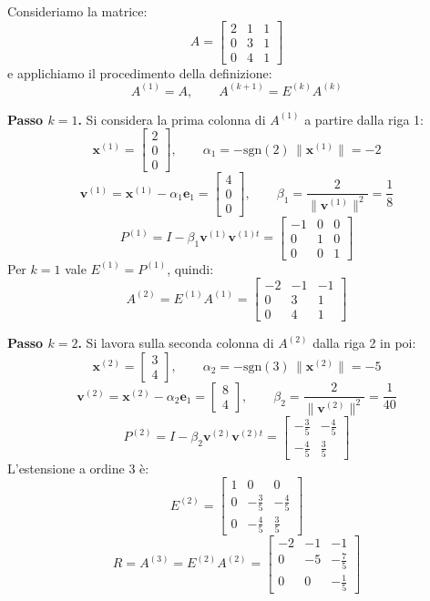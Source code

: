 \begin{example}
Consideriamo la matrice:
\[
A=
\begin{bmatrix}
2 & 1 & 1\\
0 & 3 & 1\\
0 & 4 & 1
\end{bmatrix}
\]
e applichiamo il procedimento della definizione:
\[
A^{(1)}=A, \qquad A^{(k+1)} = E^{(k)}A^{(k)}
\]

\textbf{Passo $k=1$.} Si considera la prima colonna di $A^{(1)}$ a partire dalla riga 1:
\[
\mathbf{x}^{(1)} =
\begin{bmatrix}
2\\
0\\
0
\end{bmatrix},
\qquad
\alpha_1 = -\mathrm{sgn}(2)\,\|\mathbf{x}^{(1)}\|=-2
\]
\[
\mathbf{v}^{(1)} = \mathbf{x}^{(1)}-\alpha_1\mathbf{e}_1=
\begin{bmatrix}
4\\
0\\
0
\end{bmatrix},
\qquad
\beta_1=\frac{2}{\|\mathbf{v}^{(1)}\|^2}=\frac{1}{8}
\]
\[
P^{(1)}=I-\beta_1\mathbf{v}^{(1)}\mathbf{v}^{(1)t}=
\begin{bmatrix}
-1 & 0 & 0\\
0 & 1 & 0\\
0 & 0 & 1
\end{bmatrix}
\]
Per $k=1$ vale $E^{(1)}=P^{(1)}$, quindi:
\[
A^{(2)}=E^{(1)}A^{(1)}=
\begin{bmatrix}
-2 & -1 & -1\\
0 & 3 & 1\\
0 & 4 & 1
\end{bmatrix}
\]

\textbf{Passo $k=2$.} Si lavora sulla seconda colonna di $A^{(2)}$ dalla riga 2 in poi:
\[
\mathbf{x}^{(2)}=
\begin{bmatrix}
3\\
4
\end{bmatrix},
\qquad
\alpha_2=-\mathrm{sgn}(3)\,\|\mathbf{x}^{(2)}\|=-5
\]
\[
\mathbf{v}^{(2)}=\mathbf{x}^{(2)}-\alpha_2\mathbf{e}_1=
\begin{bmatrix}
8\\
4
\end{bmatrix},
\qquad
\beta_2=\frac{2}{\|\mathbf{v}^{(2)}\|^2}=\frac{1}{40}
\]
\[
P^{(2)}=I-\beta_2\mathbf{v}^{(2)}\mathbf{v}^{(2)t}=
\begin{bmatrix}
-\frac{3}{5} & -\frac{4}{5}\\
-\frac{4}{5} & \frac{3}{5}
\end{bmatrix}
\]
L'estensione a ordine 3 è:
\[
E^{(2)}=
\begin{bmatrix}
1 & 0 & 0\\
0 & -\frac{3}{5} & -\frac{4}{5}\\
0 & -\frac{4}{5} & \frac{3}{5}
\end{bmatrix}
\]
\[
R=A^{(3)}=E^{(2)}A^{(2)}=
\begin{bmatrix}
-2 & -1 & -1\\
0 & -5 & -\frac{7}{5}\\
0 & 0 & -\frac{1}{5}
\end{bmatrix}
\]


\end{example}
